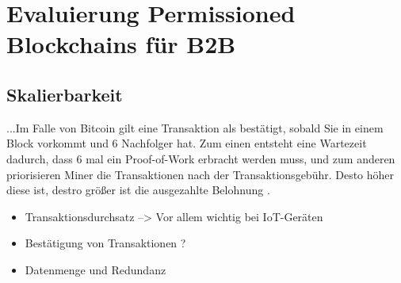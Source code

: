 \chapter{Evaluierung Permissioned Blockchains für B2B}
\label{cha:b2b-eval}


\section{Skalierbarkeit}
\label{sec:scalability-eval}

...Im Falle von Bitcoin gilt eine Transaktion als bestätigt, sobald Sie in einem Block vorkommt und 6 Nachfolger hat. Zum einen entsteht eine Wartezeit dadurch, dass 6 mal ein Proof-of-Work erbracht werden muss, und zum anderen priorisieren Miner die Transaktionen nach der Transaktionsgebühr. Desto höher diese ist, destro größer ist die ausgezahlte Belohnung \cite{BuchkoHowLongBitcoin2017}.
\begin{itemize}
    \item Transaktionsdurchsatz --> Vor allem wichtig bei IoT-Geräten
    \item Bestätigung von Transaktionen ?
    \item Datenmenge und Redundanz
\end{itemize}

